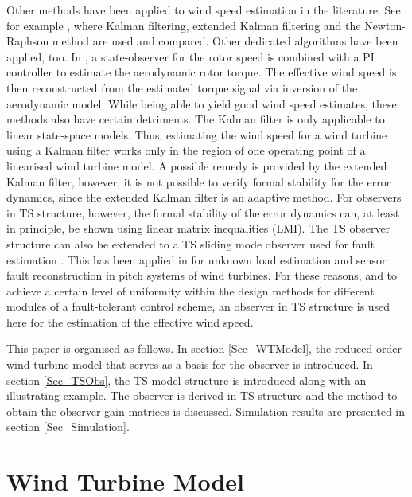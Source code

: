 \documentclass[a4paper]{article}
\begin{document}
Other methods have been applied to wind speed estimation in the literature. See for example \cite{MaPoulsen_EstWind:1995}, where Kalman filtering, extended Kalman filtering and the Newton-Raphson method are used and compared. Other dedicated algorithms have been applied, too. In \cite{Ostergaard_v_est:2007}, a state-observer for the rotor speed is combined with a PI controller to estimate the aerodynamic rotor torque. The effective wind speed is then reconstructed from the estimated torque signal via inversion of the aerodynamic model.
While being able to yield good wind speed estimates, these methods also have certain detriments.
The Kalman filter is only applicable to linear state-space models. Thus, estimating the wind speed for a wind turbine using a Kalman filter works only in the region of one operating point of a linearised wind turbine model. A possible remedy is provided by the extended Kalman filter, however, it is not possible to verify formal stability for the error dynamics, since the extended Kalman filter is an adaptive method.
\newline For observers in TS structure, however, the formal stability of the error dynamics can, at least in principle, be shown using linear matrix inequalities (LMI). The TS observer structure can also be extended to a TS sliding mode observer used for fault estimation \cite{GerlandSchulte:2010}. This has been applied in \cite{SchulteZajac:2012} for unknown load estimation and sensor fault reconstruction in pitch systems of wind turbines. For these reasons, and to achieve a certain level of uniformity within the design methods for different modules of a fault-tolerant control scheme, an observer in TS structure is used here for the estimation of the effective wind speed.


This paper is organised as follows. In section \ref{Sec_WTModel}, the reduced-order wind turbine model that serves as a basis for the observer is introduced.
In section \ref{Sec_TSObs}, the TS model structure is introduced along with an illustrating example. The observer is derived in TS structure and the method to obtain the observer gain matrices is discussed. Simulation results are presented in section \ref{Sec_Simulation}.



\section{\label{Sec_WTModel}Wind Turbine Model}
\end{document}
